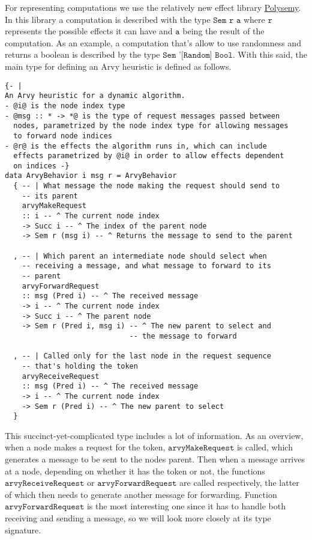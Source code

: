 \documentclass[a4paper, oneside]{discothesis}
\begin{document}
For representing computations we use the relatively new effect library \href{https://hackage.haskell.org/package/polysemy}{Polysemy}. In this library a computation is described with the type $\texttt{Sem r a}$ where $\texttt{r}$ represents the possible effects it can have and $\texttt{a}$ being the result of the computation. As an example, a computation that's allow to use randomness and returns a boolean is described by the type $\texttt{Sem '[Random] Bool}$. With this said, the main type for defining an Arvy heuristic is defined as follows.

\begin{verbatim}
{- |
An Arvy heuristic for a dynamic algorithm.
- @i@ is the node index type
- @msg :: * -> *@ is the type of request messages passed between
  nodes, parametrized by the node index type for allowing messages
  to forward node indices
- @r@ is the effects the algorithm runs in, which can include
  effects parametrized by @i@ in order to allow effects dependent
  on indices -}
data ArvyBehavior i msg r = ArvyBehavior
  { -- | What message the node making the request should send to
    -- its parent
    arvyMakeRequest
    :: i -- ^ The current node index
    -> Succ i -- ^ The index of the parent node
    -> Sem r (msg i) -- ^ Returns the message to send to the parent

  , -- | Which parent an intermediate node should select when
    -- receiving a message, and what message to forward to its
    -- parent
    arvyForwardRequest
    :: msg (Pred i) -- ^ The received message
    -> i -- ^ The current node index
    -> Succ i -- ^ The parent node
    -> Sem r (Pred i, msg i) -- ^ The new parent to select and
                             -- the message to forward

  , -- | Called only for the last node in the request sequence
    -- that's holding the token
    arvyReceiveRequest
    :: msg (Pred i) -- ^ The received message
    -> i -- ^ The current node index
    -> Sem r (Pred i) -- ^ The new parent to select
  }
\end{verbatim}

This succinct-yet-complicated type includes a lot of information. As an overview, when a node makes a request for the token, $\texttt{arvyMakeRequest}$ is called, which generates a message to be sent to the nodes parent. Then when a message arrives at a node, depending on whether it has the token or not, the functions $\texttt{arvyReceiveRequest}$ or $\texttt{arvyForwardRequest}$ are called respectively, the latter of which then needs to generate another message for forwarding. Function $\texttt{arvyForwardRequest}$ is the most interesting one since it has to handle both receiving and sending a message, so we will look more closely at its type signature.
\end{document}
